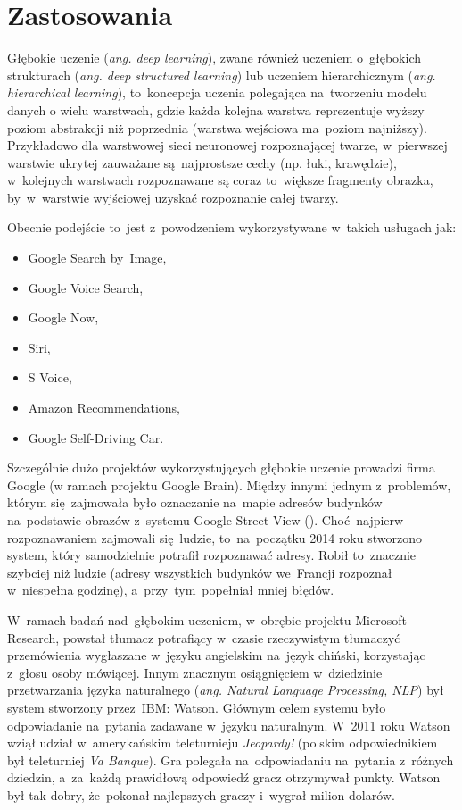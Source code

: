 \section{Zastosowania}
Głębokie uczenie (\textit{ang. deep learning}), zwane również uczeniem
o~głębokich strukturach (\textit{ang. deep structured learning}) lub uczeniem
hierarchicznym (\textit{ang. hierarchical learning}), to~koncepcja uczenia
polegająca na~tworzeniu modelu danych o wielu warstwach, gdzie każda kolejna
warstwa reprezentuje wyższy poziom abstrakcji niż poprzednia (warstwa wejściowa
ma~poziom najniższy). Przykładowo dla warstwowej sieci neuronowej rozpoznającej
twarze, w~pierwszej warstwie ukrytej zauważane są~najprostsze cechy (np. łuki,
krawędzie), w~kolejnych warstwach rozpoznawane są coraz to~większe fragmenty
obrazka, by~w~warstwie wyjściowej uzyskać rozpoznanie całej twarzy.

Obecnie podejście to~jest z~powodzeniem wykorzystywane w~takich usługach jak:
\begin{itemize}
  \item Google Search by~Image,
  \item Google Voice Search,
  \item Google Now,
  \item Siri,
  \item S Voice,
  \item Amazon Recommendations,
  \item Google Self-Driving Car.
\end{itemize}

Szczególnie dużo projektów wykorzystujących głębokie uczenie prowadzi firma
Google (w ramach projektu Google Brain). Między innymi jednym z~problemów,
którym się~zajmowała było oznaczanie na~mapie adresów budynków na~podstawie
obrazów z~systemu Google Street View (\cite{google-french-addresses}). Choć~najpierw rozpoznawaniem zajmowali
się~ludzie, to~na~początku 2014 roku stworzono system, który
samodzielnie potrafił rozpoznawać adresy. Robił to~znacznie szybciej niż ludzie
(adresy wszystkich budynków we~Francji rozpoznał w~niespełna godzinę),
a~przy~tym~popełniał mniej błędów.

W~ramach badań nad~głębokim uczeniem, w~obrębie projektu Microsoft Research,
powstał tłumacz potrafiący w~czasie rzeczywistym tłumaczyć przemówienia
wygłaszane w~języku angielskim na~język chiński, korzystając z~głosu
osoby mówiącej. Innym znacznym osiągnięciem w~dziedzinie przetwarzania języka naturalnego (\textit{ang.
Natural Language Processing, NLP}) był system stworzony przez~IBM: Watson.
Głównym celem systemu było odpowiadanie na~pytania zadawane w~języku naturalnym.
W~2011 roku Watson wziął udział w~amerykańskim teleturnieju \textit{Jeopardy!} (polskim odpowiednikiem był
teleturniej \textit{Va Banque}). Gra polegała na~odpowiadaniu na~pytania z~różnych dziedzin, a~za~każdą
prawidłową odpowiedź gracz otrzymywał punkty. Watson był tak dobry, że~pokonał najlepszych graczy i~wygrał
milion dolarów.


